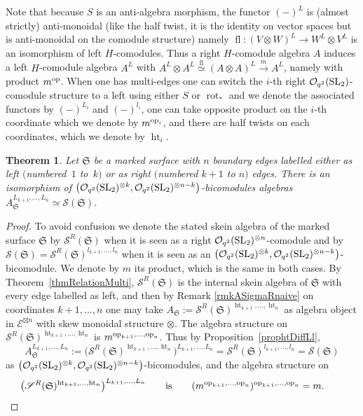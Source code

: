 \documentclass[pdftex]{sigma}%
\numberwithin{equation}{section}
\newtheorem{Theorem}{Theorem}[section]
\newcommand{\halft}{{\operatorname{ht}}}
\newcommand{\bmotimes}{\bm{\otimes}}
\newcommand{\Oq}{\mathcal{O}_{q^2}({\rm SL}_2)}
\begin{document}
Note that because $S$ is an anti-algebra morphism, the functor $(-)^L$ is (almost strictly) anti-monoidal (like the half twist, it is the identity on vector spaces but is anti-monoidal on the comodule structure) namely $\operatorname{fl}\colon (V \otimes W)^L \to W^L \otimes V^L$ is an isomorphism of left $H$-comodules. Thus a right $H$-comodule algebra $A$ induces a left $H$-comodule algebra $A^L$ with $A^L \otimes A^L \overset{\operatorname{fl}}\simeq (A\otimes A)^L \overset{m}\to A^L$, namely with product $m^{\rm op}$.
When one has multi-edges one can switch the $i$-th right $\Oq$-comodule structure to a left using either $S$ or $\operatorname{rot}_*$ and we denote the associated functors by $(-)^{L_i}$ and $(-)^{l_i}$, one can take opposite product on the $i$-th coordinate which we denote by $m^{{\rm op}_i}$, and there are half twists on each coordinates, which we denote by $\halft_i$.

\begin{Theorem}\label{thmRelationMultiAndRight}
Let $\mathfrak{S}$ be a marked surface with $n$ boundary edges labelled either as left $($num\-be\-red~$1$ to~$k)$ or as right $($numbered $k+1$ to $n)$ edges. There is an isomorphism of $\big(\Oq^{\otimes k},\allowbreak \Oq^{\otimes n-k}\big)$-bicomodules algebras $A_{\mathfrak{S}}^{L_{k+1},\dots,L_n} \simeq \mathscr{S}(\mathfrak{S})$.
\end{Theorem}
\begin{proof}
To avoid confusion we denote the stated skein algebra of the marked surface $\mathfrak{S}$ by $\mathscr{S}^R(\mathfrak{S})$ when it is seen as a right $\Oq^{\otimes n}$-comodule and by~$\mathscr{S}(\mathfrak{S})= \mathscr{S}^R(\mathfrak{S})^{l_{k+1},\dots,l_n}$ when it is seen as an $\big(\Oq^{\otimes k},\Oq^{\otimes n-k}\big)$-bicomodule. We denote by $m$ its product, which is the same in both cases.
By Theorem~\ref{thmRelationMulti}, $\mathscr{S}^R(\mathfrak{S})$ is the internal skein algebra of $\mathfrak{S}$ with every edge labelled as left, and then by Remark \ref{rmkASigmaRnaive} on coordinates $k+1,\dots,n$ one may take $A_\mathfrak{S} := \mathscr{S}^R(\mathfrak{S})^{\halft_{k+1},\dots,\halft_n}$ as algebra object in $\mathcal{E}^{\boxtimes n}$ with skew monoidal structure ${\bmotimes}$. The algebra structure on $\mathscr{S}^R(\mathfrak{S})^{\halft_{k+1},\dots,\halft_n}$ is $m^{{\rm op}_{k+1},\dots,{\rm op}_n}$.
Thus by Proposition~\ref{prophtDiffLl},
\[
A_\mathfrak{S}^{L_{k+1},\dots,L_n} := \big(\mathscr{S}^R(\mathfrak{S})^{\halft_{k+1},\dots,\halft_n}\big)^{L_{k+1},\dots,L_n} = \mathscr{S}^R(\mathfrak{S})^{l_{k+1},\dots,l_n}=\mathscr{S}(\mathfrak{S})
\]
 as $\big(\Oq^{\otimes k},\Oq^{\otimes n-k}\big)$-bi\-co\-modu\-les, and the algebra structure on \[
 \big(\mathscr{S}^R(\mathfrak{S})^{\halft_{k+1},\dots,\halft_n}\big)^{L_{k+1},\dots,L_n} \qquad \text{is} \qquad (m^{{\rm op}_{k+1},\dots,{\rm op}_n})^{{\rm op}_{k+1},\dots,{\rm op}_n}=m.\tag*{\qed}
 \]\renewcommand{\qed}{}
\end{proof}
\end{document}
